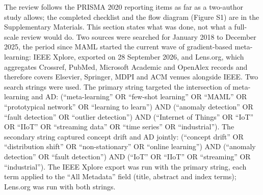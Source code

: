 The review follows the PRISMA 2020 reporting items \citep{page2021prisma} as far as a two-author study allows; the completed checklist and the flow diagram (Figure S1) are in the Supplementary Materials. This section states what was done, not what a full-scale review would do. Two sources were searched for January 2018 to December 2025, the period since MAML \citep{finn2017maml} started the current wave of gradient-based meta-learning: IEEE Xplore, exported on 28 September 2026, and Lens.org, which aggregates Crossref, PubMed, Microsoft Academic and OpenAlex records and therefore covers Elsevier, Springer, MDPI and ACM venues alongside IEEE. Two search strings were used. The primary string targeted the intersection of meta-learning and AD: (``meta-learning'' OR ``few-shot learning'' OR ``MAML'' OR ``prototypical network'' OR ``learning to learn'') AND (``anomaly detection'' OR ``fault detection'' OR ``outlier detection'') AND (``Internet of Things'' OR ``IoT'' OR ``IIoT'' OR ``streaming data'' OR ``time series'' OR ``industrial''). The secondary string captured concept drift and AD jointly: (``concept drift'' OR ``distribution shift'' OR ``non-stationary'' OR ``online learning'') AND (``anomaly detection'' OR ``fault detection'') AND (``IoT'' OR ``IIoT'' OR ``streaming'' OR ``industrial''). The IEEE Xplore export was run with the primary string, each term applied to the ``All Metadata'' field (title, abstract and index terms); Lens.org was run with both strings.

